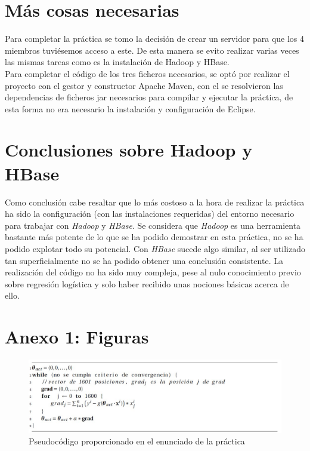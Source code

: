 \documentclass[11pt,a4paper]{article}
\begin{document}
\label{listing:enunciado}

\section{Más cosas necesarias}
Para completar la práctica se tomo la decisión de crear un servidor para que los 4 miembros tuviésemos acceso a este. De esta manera se evito realizar varias veces las mismas tareas como es la instalación de Hadoop y HBase. \\
Para completar el código de los tres ficheros necesarios, se optó por realizar el proyecto con el gestor y constructor  Apache Maven, con el se resolvieron las dependencias de ficheros jar necesarios para compilar y ejecutar la práctica, de esta forma no era necesario la instalación y configuración de Eclipse.
\newpage
\section{Conclusiones sobre Hadoop y HBase}
Como conclusión cabe resaltar que lo más costoso a la hora de realizar la práctica ha sido la configuración (con las instalaciones requeridas) del entorno necesario para trabajar con \emph{Hadoop} y \emph{HBase}. Se considera que \emph{Hadoop} es una herramienta bastante más potente de lo que se ha podido demostrar en esta práctica, no se ha podido explotar todo su potencial. Con \emph{HBase} sucede algo similar, al ser utilizado tan superficialmente no se ha podido obtener una conclusión consistente. La realización del código no ha sido muy compleja, pese al nulo conocimiento previo sobre regresión logística y solo haber recibido unas nociones básicas acerca de ello.
\newpage
\section{Anexo 1: Figuras}

\begin{figure}[h!]
\centering
\includegraphics[scale=0.75]{images/pseudocodigo_enunciado.jpg}
\caption{Pseudocódigo proporcionado en el enunciado de la práctica}
\label{fig:pseudoenunciado}
\end{figure}
\end{document}
